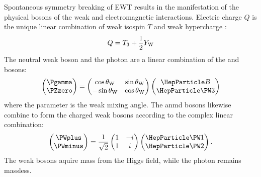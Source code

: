 Spontaneous symmetry breaking of EWT results in the manifestation of the physical bosons of the weak and electromagnetic interactions.
Electric charge $Q$ is the unique linear combination of weak isospin $T$ and weak hypercharge \YW:
\begin{equation}
    Q = T_3 +\frac{1}{2}Y_{\text{W}}
\end{equation}
The neutral weak boson \PZzero and the photon \Pgamma are a linear combination of the  and \PBewt bosons:
\begin{equation}
    \left(
    \begin{matrix}
        \Pgamma \\
        \PZzero
    \end{matrix}
    \right)
    =
    \left(
    \begin{matrix}
        \cos\weakangle & \sin\weakangle \\
        -\sin\weakangle & \cos\weakangle
    \end{matrix}
    \right)
    \left(
    \begin{matrix}
        \PBewt \\
        \PWewt{3}
    \end{matrix}
    \right)
\end{equation} 
where the parameter \weakangle is the weak mixing angle. The  anmd  bosons likewise combine to form the charged weak bosons \PWpm according to the complex linear combination:
\begin{equation}
    \left(
    \begin{matrix}
        \PWplus \\
        \PWminus
    \end{matrix}
    \right)
    =
    \frac{1}{\sqrt{2}}
    \left(
    \begin{matrix}
        1 & -i \\
        1 & i
    \end{matrix}
    \right)
    \left(
    \begin{matrix}
        \PWewt{1} \\
        \PWewt{2}
    \end{matrix}
    \right).
\end{equation}
The weak bosons aquire mass from the Higgs field, while the photon remains massless. 

